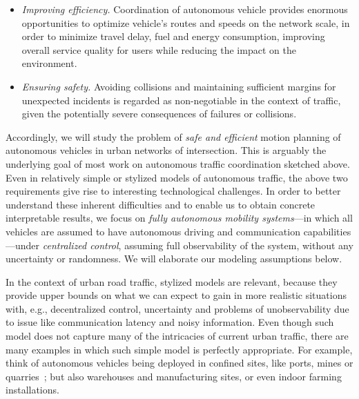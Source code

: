 \documentclass[a4paper]{report}
\theoremstyle{definition}
\theoremstyle{plain}
\begin{document}
\begin{itemize}
  \item \emph{Improving efficiency.}
        Coordination of autonomous vehicle provides enormous opportunities to
        optimize vehicle's routes and speeds on the network scale, in order to
        minimize travel delay, fuel and energy consumption, improving overall
        service quality for users while reducing the impact on the environment.

  \item \emph{Ensuring safety.}
        Avoiding collisions and maintaining sufficient margins for unexpected
        incidents is regarded as non-negotiable in the context of traffic, given
        the potentially severe consequences of failures or collisions.

\end{itemize}

Accordingly, we will study the problem of \emph{safe and efficient} motion
planning of autonomous vehicles in urban networks of intersection.
%
This is arguably the underlying goal of most work on autonomous traffic
coordination sketched above.
%
Even in relatively simple or stylized models of autonomous traffic, the above
two requirements give rise to interesting technological challenges.
%
In order to better understand these inherent difficulties and to enable us to
obtain concrete interpretable results, we focus on \emph{fully autonomous
  mobility systems}---in which all vehicles are assumed to have autonomous
driving and communication capabilities---under \emph{centralized control},
assuming full observability of the system, without any uncertainty or
randomness.
%
We will elaborate our modeling assumptions below.


%
In the context of urban road traffic, stylized models are relevant, because they
provide upper bounds on what we can expect to gain in more realistic situations
with, e.g., decentralized control, uncertainty and problems of unobservability
due to issue like communication latency and noisy information.
%
Even though such model does not capture many of the intricacies of current urban
traffic, there are many examples in which such simple model is perfectly
appropriate. For example, think of autonomous vehicles being deployed in
confined sites, like ports, mines or
quarries~\cite{kojchevOptimizationBasedCoordination2024}; but also warehouses
and manufacturing sites, or even indoor farming installations.
\end{document}
